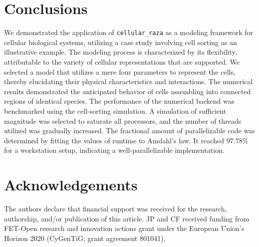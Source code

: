 \documentclass[fontsize=11pt,a4paper]{article}
\begin{document}
\section{Conclusions}\label{conclusions}

We demonstrated the application of \texttt{cellular\_raza} as a modeling framework for cellular
biological systems, utilizing a case study involving cell sorting as an illustrative example.
The modeling process is characterized by its flexibility, attributable to the variety of cellular
representations that are supported.
We selected a model that utilizes a mere four parameters to represent the cells, thereby elucidating
their physical characteristics and interactions.
The numerical results demonstrated the anticipated behavior of cells assembling into connected
regions of identical species.
The performance of the numerical backend was benchmarked using the cell-sorting simulation.
A simulation of sufficient magnitude was selected to saturate all processors, and the number of
threads utilized was gradually increased.
The fractional amount of parallelizable code was determined by fitting the values of runtime to
Amdahl's law.
It reached $97.78\%$ for a workstation setup, indicating a well-parallelizable implementation.

\section{Acknowledgements} 

The authors declare that financial support was received for the research, authorship, and/or
publication of this article.
JP and CF received funding from FET-Open research and innovation actions grant
under the European Union’s Horizon 2020 (CyGenTiG; grant agreement 801041).



\end{document}

